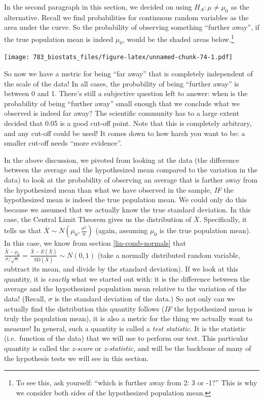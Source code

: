 \documentclass[]{book}
\let\rmarkdownfootnote\footnote%
\def\footnote{\protect\rmarkdownfootnote}
\theoremstyle{definition}
\theoremstyle{definition}
\theoremstyle{definition}
\theoremstyle{remark}
\begin{document}
In the second paragraph in this section, we decided on using \(H_A: \mu \neq \mu_0\) as the alternative. Recall we find probabilities for continuous random variables as the area under the curve. So the probability of observing something ``further away'', if the true population mean is indeed \(\mu_0\), would be the shaded areas below.\footnote{To see this, ask yourself: ``which is further away from 2: 3 or -1?'' This is why we consider both sides of the hypothesized population mean.}

\texttt{[image: 783\_biostats\_files/figure-latex/unnamed-chunk-74-1.pdf]}

So now we have a metric for being ``far away'' that is completely independent of the scale of the data! In all cases, the probability of being ``further away'' is between 0 and 1. There's still a subjective question left to answer: when is the probability of being ``further away'' small enough that we conclude what we observed is indeed far away? The scientific community has to a large extent decided that 0.05 is a good cut-off point. Note that this is completely arbitrary, and any cut-off could be used! It comes down to how harsh you want to be: a smaller cut-off needs ``more evidence''.

In the above discussion, we pivoted from looking at the data (the difference between the average and the hypothesized mean compared to the variation in the data) to look at the probability of observing an average that is farther away from the hypothesized mean than what we have observed in the sample, \emph{IF} the hypothesized mean is indeed the true population mean. We could only do this because we assumed that we actually know the true standard deviation. In this case, the Central Limit Theorem gives us the distribution of \(\bar{X}\). Specifically, it tells us that \(\bar{X} \sim N\left(\mu_0, \frac{\sigma^2}{n}\right)\) (again, assuming \(\mu_0\) is the true population mean). In this case, we know from section \ref{lin-comb-normals} that \(\frac{\bar{X} - \mu_0}{\sigma/\sqrt{n}} = \frac{\bar{X} - E(\bar{X})}{\text{SD}(\bar{X})} \sim N(0,1)\) (take a normally distributed random variable, subtract its mean, and divide by the standard deviation). If we look at this quantity, it is \emph{exactly} what we started out with: it is the difference between the average and the hypothesized population mean relative to the variation of the data! (Recall, \(\sigma\) is the standard deviation of the data.) So not only can we actually find the distribution this quantity follows (\emph{IF} the hypothesized mean is truly the population mean), it is also a metric for the thing we actually want to measure! In general, such a quantity is called a \emph{test statistic}. It is the statistic (i.e.~function of the data) that we will use to perform our test. This particular quantity is called the \emph{z-score} or \emph{z-statistic}, and will be the backbone of many of the hypothesis tests we will see in this section.
\end{document}
